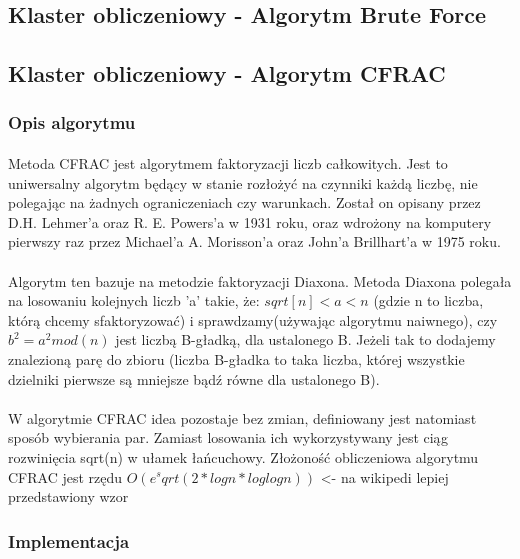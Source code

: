 \documentclass{article}
\begin{document}
\subsection{Klaster obliczeniowy - Algorytm Brute Force}

\subsection{Klaster obliczeniowy - Algorytm CFRAC}
\subsubsection{Opis algorytmu\cite{cfracwiki}\cite{cfracinz}}
\paragraph{}Metoda CFRAC  jest algorytmem faktoryzacji liczb całkowitych. Jest to uniwersalny algorytm będący w stanie rozłożyć na czynniki każdą liczbę, nie polegając na żadnych ograniczeniach czy warunkach. Został on opisany przez D.H. Lehmer'a oraz R. E. Powers'a w 1931 roku, oraz wdrożony na komputery pierwszy raz przez Michael'a A. Morisson'a oraz John'a Brillhart'a w 1975 roku.

\paragraph{}Algorytm ten bazuje na metodzie faktoryzacji Diaxona. Metoda Diaxona polegała na losowaniu kolejnych liczb 'a' takie, że:
$sqrt[n] < a < n$ (gdzie n to liczba, którą chcemy sfaktoryzować)
i sprawdzamy(używając algorytmu naiwnego), czy $b^2 = a^2mod(n)$ jest liczbą B-gładką, dla ustalonego B. Jeżeli tak to dodajemy znalezioną parę do zbioru (liczba B-gładka to taka liczba, której wszystkie dzielniki pierwsze są mniejsze bądź równe dla ustalonego B).

\paragraph{}W algorytmie CFRAC idea pozostaje bez zmian, definiowany jest natomiast sposób wybierania par. Zamiast losowania ich wykorzystywany jest ciąg rozwinięcia sqrt(n) w ułamek łańcuchowy. Złożoność obliczeniowa algorytmu CFRAC jest rzędu $O(e^sqrt(2* logn * loglog n))$ <- na wikipedi lepiej przedstawiony wzor

\subsubsection{Implementacja\cite{cfracimpl}}
\end{document}
